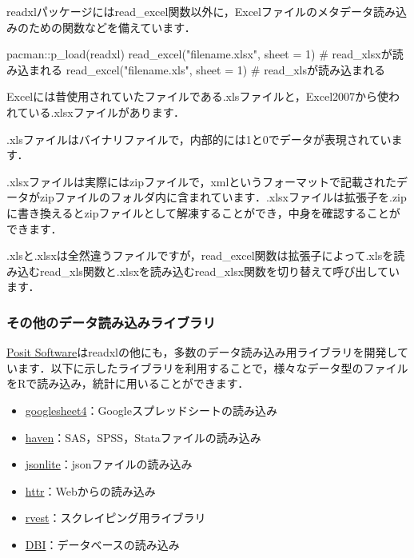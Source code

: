 \documentclass[
  letterpaper,
  DIV=11,
  numbers=noendperiod]{scrreprt}
\newenvironment{Shaded}{\begin{snugshade}}{\end{snugshade}}
\newcommand{\AttributeTok}[1]{\textcolor[rgb]{0.40,0.45,0.13}{#1}}
\newcommand{\CommentTok}[1]{\textcolor[rgb]{0.37,0.37,0.37}{#1}}
\newcommand{\DecValTok}[1]{\textcolor[rgb]{0.68,0.00,0.00}{#1}}
\newcommand{\FunctionTok}[1]{\textcolor[rgb]{0.28,0.35,0.67}{#1}}
\newcommand{\NormalTok}[1]{\textcolor[rgb]{0.00,0.23,0.31}{#1}}
\newcommand{\SpecialCharTok}[1]{\textcolor[rgb]{0.37,0.37,0.37}{#1}}
\newcommand{\StringTok}[1]{\textcolor[rgb]{0.13,0.47,0.30}{#1}}
\providecommand{\tightlist}{%
  \setlength{\itemsep}{0pt}\setlength{\parskip}{0pt}}\usepackage{longtable,booktabs,array}
\begin{document}
readxlパッケージにはread\_excel関数以外に，Excelファイルのメタデータ読み込みのための関数などを備えています．

\begin{Shaded}
\begin{Highlighting}[]
\NormalTok{pacman}\SpecialCharTok{::}\FunctionTok{p\_load}\NormalTok{(readxl)}
\FunctionTok{read\_excel}\NormalTok{(}\StringTok{"filename.xlsx"}\NormalTok{, }\AttributeTok{sheet =} \DecValTok{1}\NormalTok{) }\CommentTok{\# read\_xlsxが読み込まれる}
\FunctionTok{read\_excel}\NormalTok{(}\StringTok{"filename.xls"}\NormalTok{, }\AttributeTok{sheet =} \DecValTok{1}\NormalTok{) }\CommentTok{\# read\_xlsが読み込まれる}
\end{Highlighting}
\end{Shaded}

Excelには昔使用されていたファイルである.xlsファイルと，Excel2007から使われている.xlsxファイルがあります．

.xlsファイルはバイナリファイルで，内部的には1と0でデータが表現されています．

.xlsxファイルは実際にはzipファイルで，xmlというフォーマットで記載されたデータがzipファイルのフォルダ内に含まれています．.xlsxファイルは拡張子を.zipに書き換えるとzipファイルとして解凍することができ，中身を確認することができます．

.xlsと.xlsxは全然違うファイルですが，read\_excel関数は拡張子によって.xlsを読み込むread\_xls関数と.xlsxを読み込むread\_xlsx関数を切り替えて呼び出しています．

\hypertarget{ux305dux306eux4ed6ux306eux30c7ux30fcux30bfux8aadux307fux8fbcux307fux30e9ux30a4ux30d6ux30e9ux30ea}{%
\subsubsection{その他のデータ読み込みライブラリ}\label{ux305dux306eux4ed6ux306eux30c7ux30fcux30bfux8aadux307fux8fbcux307fux30e9ux30a4ux30d6ux30e9ux30ea}}

\href{https://posit.co/}{Posit
Software}はreadxlの他にも，多数のデータ読み込み用ライブラリを開発しています．以下に示したライブラリを利用することで，様々なデータ型のファイルをRで読み込み，統計に用いることができます．

\begin{itemize}
\tightlist
\item
  \href{https://googlesheets4.tidyverse.org/}{googlesheet4}：Googleスプレッドシートの読み込み
\item
  \href{https://haven.tidyverse.org/}{haven}：SAS，SPSS，Stataファイルの読み込み
\item
  \href{https://cran.r-project.org/web/packages/jsonlite/vignettes/json-aaquickstart.html}{jsonlite}：jsonファイルの読み込み
\item
  \href{https://httr.r-lib.org/}{httr}：Webからの読み込み
\item
  \href{https://rvest.tidyverse.org/}{rvest}：スクレイピング用ライブラリ
\item
  \href{https://dbi.r-dbi.org/}{DBI}：データベースの読み込み
\end{itemize}
\end{document}
